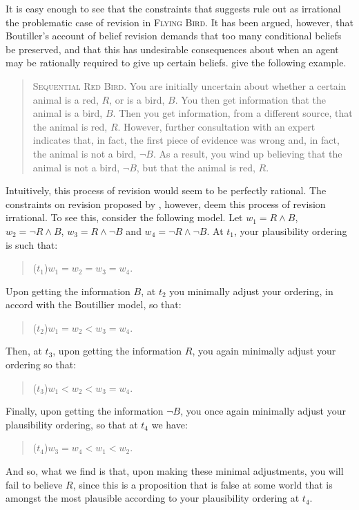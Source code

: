 It is easy enough to see that the constraints that \citet{Boutilier1} suggests rule out as irrational the problematic case of revision in \textsc{Flying Bird}.
It has been argued, however, that Boutiller's account of belief revision demands that too many conditional beliefs be preserved, and that this has undesirable consequences about when an agent may be rationally required to give up certain beliefs. \citet{DarwichePearle} give the following example.
\begin{quote}
\textsc{Sequential Red Bird.}\; You are initially uncertain about whether a certain animal is a red, $R$, or is a bird, $B$.
You then get information that the animal is a bird, $B$.
Then you get information, from a different source, that the animal is red, $R$.
However, further consultation with an expert indicates that, in fact, the first piece of evidence was wrong and, in fact, the animal is not a bird, $\lnot B$.
As a result, you wind up believing that the animal is not a bird, $\lnot B$, but that the animal is red, $R$.
\end{quote}
Intuitively, this process of revision would seem to be perfectly rational.
The constraints on revision proposed by \citet{Boutilier1}, however, deem this process of revision irrational.
To see this, consider the following model.
Let $w_1 = R \wedge B$, $w_2 = \lnot R \wedge B$, $w_3 = R \wedge \lnot B$ and $w_4 =  \lnot R \wedge \lnot B$.
At $t_1$, your plausibility ordering is such that:
\begin{quote}
($t_1$)\quad $w_1 = w_2 = w_3 = w_4$.
\end{quote}
Upon getting the information $B$, at $t_2$ you minimally adjust your ordering, in accord with the Boutillier model, so that: 
\begin{quote}
($t_2$)\quad $w_1 = w_2 < w_3 = w_4$.
\end{quote}
Then, at $t_3$, upon getting the information $R$, you again minimally adjust your ordering so that: 
\begin{quote}
($t_3$)\quad $w_1 < w_2 < w_3 = w_4$.
\end{quote}
Finally, upon getting the information $\lnot B$, you once again minimally adjust your plausibility ordering, so that at $t_4$ we have:
\begin{quote}
($t_4$)\quad $w_3 = w_4 < w_1 < w_2$.
\end{quote}
And so, what we find is that, upon making these minimal adjustments, you will fail to believe $R$, since this is a proposition that is false at some world that is amongst the most plausible according to your plausibility ordering at $t_4$.

